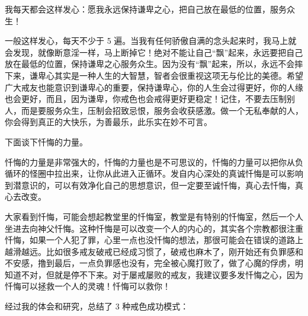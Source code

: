\documentclass{ctexart}
\begin{document}
我每天都会这样发心：愿我永远保持谦卑之心，把自己放在最低的位置，服务众生！

一般这样发心，每天不少于 5 遍。当我有任何骄傲自满的念头起来时，我马上就会发现，就像断意淫一样，马上断掉它！绝对不能让自己“飘”起来，永远要把自己放在最低的位置，保持谦卑之心服务众生。因为没有“飘”起来，所以，永远不会摔下来，谦卑心其实是一种人生的大智慧，智者会很重视这项无与伦比的美德。希望广大戒友也能意识到谦卑心的重要，保持谦卑心，你的人生会过得更好，你的人缘也会更好，而且，因为谦卑，你戒色也会戒得更好更稳定！记住，不要去压制别人，而是要服务众生，压制会招致忌恨，服务会收获感激。做一个无私奉献的人，你会得到真正的大快乐，为善最乐，此乐实在妙不可言。

下面谈下忏悔的力量。

忏悔的力量是非常强大的，忏悔的力量也是不可思议的，忏悔的力量可以把你从负循环的怪圈中拉出来，让你从此进入正循环。发自内心深处的真诚忏悔是可以影响到潜意识的，可以有效净化自己的思想意识，但一定要至诚忏悔，真心去忏悔，真心去改变。

大家看到忏悔，可能会想起教堂里的忏悔室，教堂是有特别的忏悔室，然后一个人坐进去向神父忏悔。这种忏悔是可以改变一个人的内心的，其实各个宗教都很注重忏悔，如果一个人犯了罪，心里一点也没忏悔的想法，那很可能会在错误的道路上越滑越远。比如很多戒友破戒已经成习惯了，破戒也麻木了，刚开始还有负罪感和不安感，撸到最后，一点负罪感也没有，完全被心魔打败了，做了心魔的俘虏，明知道不对，但就是停不下来。对于屡戒屡败的戒友，我建议要多发忏悔之心，因为忏悔可以拯救一个人的灵魂！忏悔可以救你！

经过我的体会和研究，总结了 3 种戒色成功模式：
\end{document}
